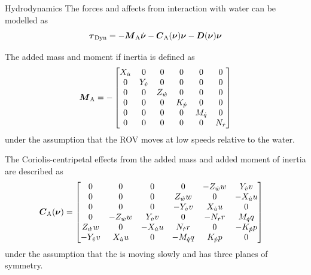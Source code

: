 \documentclass[11pt]{beamer}
\begin{document}
\begin{frame}{Hydrodynamics}
The forces and affects from interaction with water can be modelled as
\begin{equation} \label{eq:dyn}
 \boldsymbol{\tau}_\text{{Dyn}}=-\boldsymbol{M}_{\text{A}} \dot{\boldsymbol{\nu}} -\boldsymbol{C}_{\text{A}}(\boldsymbol{\nu})\boldsymbol{\nu} - \boldsymbol{D}(\boldsymbol{\nu})\boldsymbol{\nu}  
\end{equation} 


The added mass and moment if inertia is defined as
\begin{equation}
\boldsymbol{M}_\text{A} =
-\begin{bmatrix}
    X_{\dot{u}} & 0 & 0 & 0 & 0 & 0 \\
    0 & Y_{\dot{v}} & 0 & 0 & 0 & 0 \\
    0 & 0 & Z_{\dot{w}} & 0 & 0 & 0 \\
    0 & 0 & 0 & K_{\dot{p}}& 0 & 0 \\
    0 & 0 & 0 & 0 & M_{\dot{q}} & 0 \\
    0 & 0 & 0 & 0 & 0 & N_{\dot{r}} \\
    \end{bmatrix}
\end{equation}
under the assumption that the ROV moves at low speeds relative to the water.
\end{frame}

\begin{frame}
The Coriolis-centripetal effects from the added mass and added moment of inertia are described as
\begin{align}
    \boldsymbol{C}_\text{A}(\boldsymbol{\nu}) &= 
    \begin{bmatrix}
    0 & 0 & 0 & 0 & -Z_{\dot{w}} w & Y_{\dot{v}} v \\
    0 & 0 & 0 & Z_{\dot{w}} w & 0 & -X_{\dot{u}} u \\
    0 & 0 & 0 & -Y_{\dot{v}} v & X_{\dot{u}} u & 0 \\
    0 & -Z_{\dot{w}} w & Y_{\dot{v}} v & 0 & -N_{\dot{r}} r & M_{\dot{q}} q \\
    Z_{\dot{w}} w & 0 & -X_{\dot{u}} u & N_{\dot{r}} r & 0 & -K_{\dot{p}} p \\
    -Y_{\dot{v}} v & X_{\dot{u}} u & 0 & - M_{\dot{q}} q & K_{\dot{p}} p & 0 \\
    \end{bmatrix}
\end{align}
under the assumption that the \abbrROV is moving slowly and has three planes of symmetry.
\end{frame}
\end{document}
